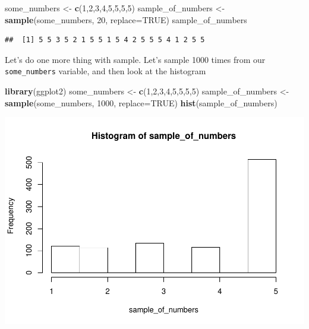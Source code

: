 \documentclass[]{book}
\newenvironment{Shaded}{\begin{snugshade}}{\end{snugshade}}
\newcommand{\KeywordTok}[1]{\textcolor[rgb]{0.13,0.29,0.53}{\textbf{#1}}}
\newcommand{\DataTypeTok}[1]{\textcolor[rgb]{0.13,0.29,0.53}{#1}}
\newcommand{\DecValTok}[1]{\textcolor[rgb]{0.00,0.00,0.81}{#1}}
\newcommand{\StringTok}[1]{\textcolor[rgb]{0.31,0.60,0.02}{#1}}
\newcommand{\OtherTok}[1]{\textcolor[rgb]{0.56,0.35,0.01}{#1}}
\newcommand{\NormalTok}[1]{#1}
\begin{document}
\begin{Shaded}
\begin{Highlighting}[]
\NormalTok{some_numbers <-}\StringTok{ }\KeywordTok{c}\NormalTok{(}\DecValTok{1}\NormalTok{,}\DecValTok{2}\NormalTok{,}\DecValTok{3}\NormalTok{,}\DecValTok{4}\NormalTok{,}\DecValTok{5}\NormalTok{,}\DecValTok{5}\NormalTok{,}\DecValTok{5}\NormalTok{,}\DecValTok{5}\NormalTok{)}
\NormalTok{sample_of_numbers <-}\KeywordTok{sample}\NormalTok{(some_numbers, }\DecValTok{20}\NormalTok{, }\DataTypeTok{replace=}\OtherTok{TRUE}\NormalTok{)}
\NormalTok{sample_of_numbers}
\end{Highlighting}
\end{Shaded}

\begin{verbatim}
##  [1] 5 5 3 5 2 1 5 5 1 5 4 2 5 5 5 4 1 2 5 5
\end{verbatim}

Let's do one more thing with sample. Let's sample 1000 times from our
\texttt{some\_numbers} variable, and then look at the histogram

\begin{Shaded}
\begin{Highlighting}[]
\KeywordTok{library}\NormalTok{(ggplot2)}
\NormalTok{some_numbers <-}\StringTok{ }\KeywordTok{c}\NormalTok{(}\DecValTok{1}\NormalTok{,}\DecValTok{2}\NormalTok{,}\DecValTok{3}\NormalTok{,}\DecValTok{4}\NormalTok{,}\DecValTok{5}\NormalTok{,}\DecValTok{5}\NormalTok{,}\DecValTok{5}\NormalTok{,}\DecValTok{5}\NormalTok{)}
\NormalTok{sample_of_numbers <-}\KeywordTok{sample}\NormalTok{(some_numbers, }\DecValTok{1000}\NormalTok{, }\DataTypeTok{replace=}\OtherTok{TRUE}\NormalTok{)}
\KeywordTok{hist}\NormalTok{(sample_of_numbers)}
\end{Highlighting}
\end{Shaded}

\includegraphics{Statistics_Lab_files/figure-latex/unnamed-chunk-107-1.pdf}
\end{document}
